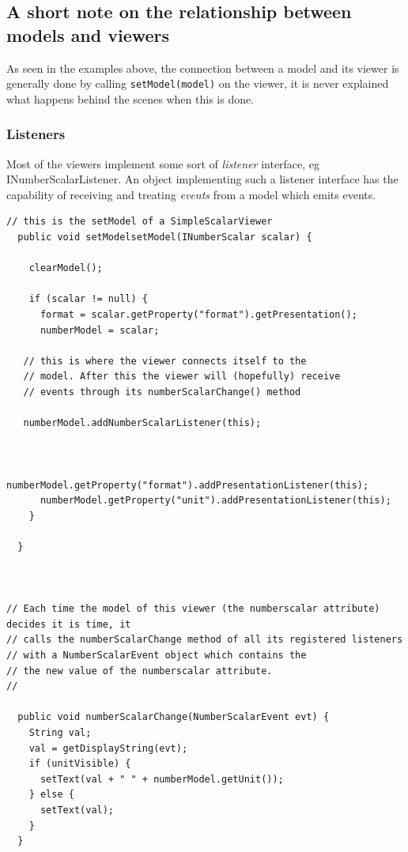 \subsection{A short note on the relationship between models and viewers}

As seen in the examples above, the connection between a model
and its viewer is generally done by calling \texttt{setModel(model)}
on the viewer, it is never explained what happens behind
the scenes when this is done.


\subsubsection{Listeners}

Most of the viewers implement some sort of \emph{listener}
interface, eg INumberScalarListener.
An object implementing such a listener interface has the capability
of receiving and treating \emph{events} from a model
which emits events.


\begin{verbatim}
// this is the setModel of a SimpleScalarViewer
  public void setModelsetModel(INumberScalar scalar) {

    clearModel();

    if (scalar != null) {
      format = scalar.getProperty("format").getPresentation();
      numberModel = scalar;
 
   // this is where the viewer connects itself to the 
   // model. After this the viewer will (hopefully) receive 
   // events through its numberScalarChange() method

   numberModel.addNumberScalarListener(this);
 
      
        numberModel.getProperty("format").addPresentationListener(this);
      numberModel.getProperty("unit").addPresentationListener(this);
    }

  }
 
 

// Each time the model of this viewer (the numberscalar attribute) decides it is time, it 
// calls the numberScalarChange method of all its registered listeners
// with a NumberScalarEvent object which contains the 
// the new value of the numberscalar attribute.
//
 
  public void numberScalarChange(NumberScalarEvent evt) {
    String val;
    val = getDisplayString(evt);
    if (unitVisible) {
      setText(val + " " + numberModel.getUnit());
    } else {
      setText(val);
    }
  }



\end{verbatim}


